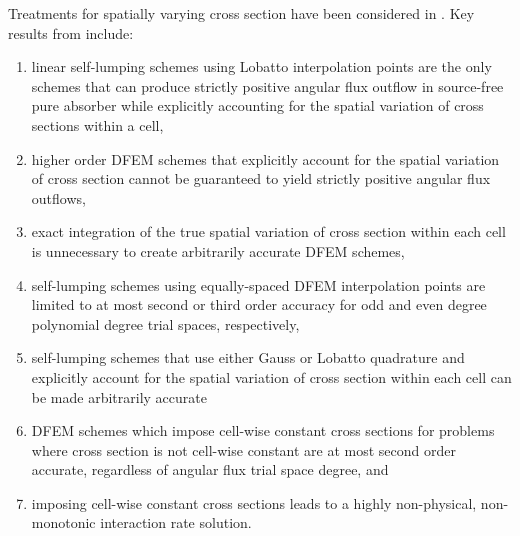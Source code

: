 \documentclass[final,3p,times]{elsarticle}
\begin{document}
Treatments for spatially varying cross section have been considered in \cite{part_2_paper}.  Key results from \cite{part_2_paper} include:
\begin{enumerate}
\item linear self-lumping schemes using Lobatto interpolation points are the only schemes that can produce strictly positive angular flux outflow in source-free pure absorber while explicitly accounting for the spatial variation of cross sections within a cell,
\item higher order DFEM schemes that explicitly account for the spatial variation of cross section cannot be guaranteed to yield strictly positive angular flux outflows,
\item exact integration of the true spatial variation of cross section within each cell is unnecessary to create arbitrarily accurate DFEM schemes,
\item self-lumping schemes using equally-spaced DFEM interpolation points are limited to at most second or third order accuracy for odd and even degree polynomial degree trial spaces, respectively, 
\item self-lumping schemes that use either Gauss or Lobatto quadrature and explicitly account for the spatial variation of cross section within each cell can be made arbitrarily accurate
\item DFEM schemes which impose cell-wise constant cross sections for problems where cross section is not cell-wise constant are at most second order accurate, regardless of angular flux trial space degree, and
\item imposing cell-wise constant cross sections leads to a highly non-physical, non-monotonic interaction rate solution.
\end{enumerate}
\end{document}
